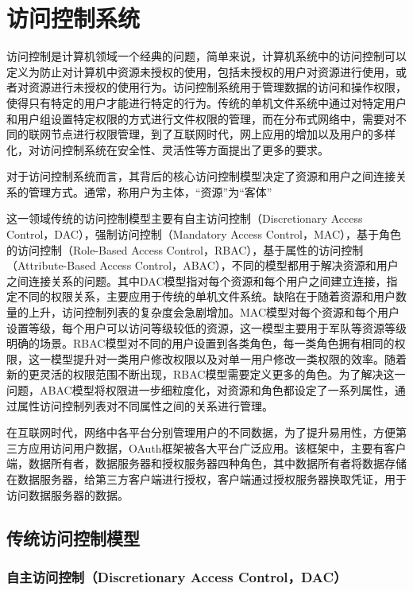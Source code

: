 
\chapter{访问控制系统}

访问控制是计算机领域一个经典的问题，简单来说，计算机系统中的访问控制可以定义为防止对计算机中资源未授权的使用，包括未授权的用户对资源进行使用，或者对资源进行未授权的使用行为。访问控制系统用于管理数据的访问和操作权限，使得只有特定的用户才能进行特定的行为。传统的单机文件系统中通过对特定用户和用户组设置特定权限的方式进行文件权限的管理，而在分布式网络中，需要对不同的联网节点进行权限管理，到了互联网时代，网上应用的增加以及用户的多样化，对访问控制系统在安全性、灵活性等方面提出了更多的要求。

对于访问控制系统而言，其背后的核心访问控制模型决定了资源和用户之间连接关系的管理方式。通常，称用户为主体，“资源”为“客体”

这一领域传统的访问控制模型主要有自主访问控制（Discretionary Access Control，DAC），强制访问控制（Mandatory Access Control，MAC），基于角色的访问控制（Role-Based Access Control，RBAC），基于属性的访问控制（Attribute-Based Access Control，ABAC），不同的模型都用于解决资源和用户之间连接关系的问题。其中DAC模型指对每个资源和每个用户之间建立连接，指定不同的权限关系，主要应用于传统的单机文件系统。缺陷在于随着资源和用户数量的上升，访问控制列表的复杂度会急剧增加。MAC模型对每个资源和每个用户设置等级，每个用户可以访问等级较低的资源，这一模型主要用于军队等资源等级明确的场景。RBAC模型对不同的用户设置到各类角色，每一类角色拥有相同的权限，这一模型提升对一类用户修改权限以及对单一用户修改一类权限的效率。随着新的更灵活的权限范围不断出现，RBAC模型需要定义更多的角色。为了解决这一问题，ABAC模型将权限进一步细粒度化，对资源和角色都设定了一系列属性，通过属性访问控制列表对不同属性之间的关系进行管理。

在互联网时代，网络中各平台分别管理用户的不同数据，为了提升易用性，方便第三方应用访问用户数据，OAuth框架被各大平台广泛应用。该框架中，主要有客户端，数据所有者，数据服务器和授权服务器四种角色，其中数据所有者将数据存储在数据服务器，给第三方客户端进行授权，客户端通过授权服务器换取凭证，用于访问数据服务器的数据。

\section{传统访问控制模型}

\subsection{自主访问控制（Discretionary Access Control，DAC）}

